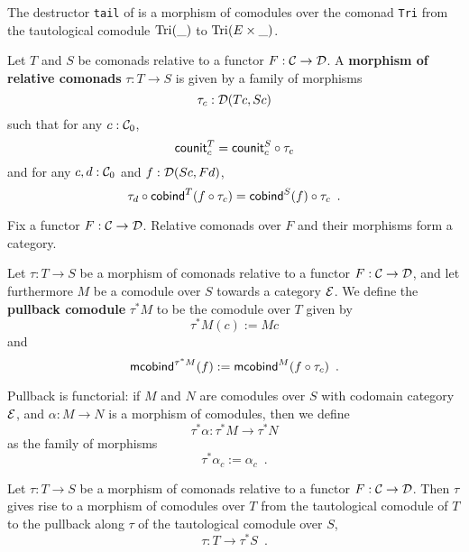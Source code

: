 \documentclass{amsart}
\newcommand{\fat}[1]{\textbf{#1}}
\begin{document}
% 
%   
% 
%  
%  





\begin{example}
 The destructor \lstinline!tail! of  is a morphism of comodules over the comonad \lstinline!Tri! 
  from the tautological comodule  $\text{\lstinline!Tri!}(\_)$ to $\text{\lstinline!Tri!}(E\times \_)$.
\end{example}


\begin{definition}
 Let $T$ and $S$ be comonads relative to a functor $F : \C \to \D$. A \fat{morphism of relative comonads} $\tau : T \to S$
  is given by a family of morphisms \[\tau_c : \D(Tc,Sc)\] such that for any $c : \C_0$,
     \[  \counit^T_c = \comp{\tau_c}{\counit^S_c} \]
   and for any $c,d : \C_0$ and $f : \D(Sc,Fd)$,
   \[  \comp{\cobind^T(\comp{\tau_c}{f})}{\tau_d} = \comp{\tau_c}{\cobind^S(f)} \enspace .  \]
\end{definition}

\begin{remark}
 Fix a functor $F : \C\to\D$. Relative comonads over $F$ and their morphisms form a category.
\end{remark}


\begin{definition}\label{def:pullback_comodule}
  Let $\tau : T\to S$ be a morphism of comonads relative to a functor $F : \C \to \D$, and let furthermore $M$ be a 
  comodule over $S$ towards a category $\E$. We define the \fat{pullback comodule} $\tau^*M$ to be the comodule over $T$ given by
  \[  \tau^*M(c) := Mc \]
  and 
   \[ \mcobind^{\tau^*M}(f) := \mcobind^M(\comp{\tau_c}{f}) \enspace . \]
   
  \noindent
  Pullback is functorial: if $M$ and $N$ are comodules over $S$ with codomain category $\E$, and $\alpha : M\to N$ is 
    a morphism of comodules, then we define \[\tau^*\alpha : \tau^*M \to \tau^*N\] 
    as the family of morphisms
     \[ \tau^*\alpha_c := \alpha_c \enspace . \]
\end{definition}

\begin{definition}
  Let $\tau : T\to S$ be a morphism of comonads relative to a functor $F : \C \to \D$.
  Then $\tau$ gives rise to a morphism of comodules over $T$ from the tautological comodule
  of $T$ to the pullback along $\tau$ of the tautological comodule over $S$,
  \[ \tau : T \to \tau^*S \enspace . \]
\end{definition}
\end{document}
